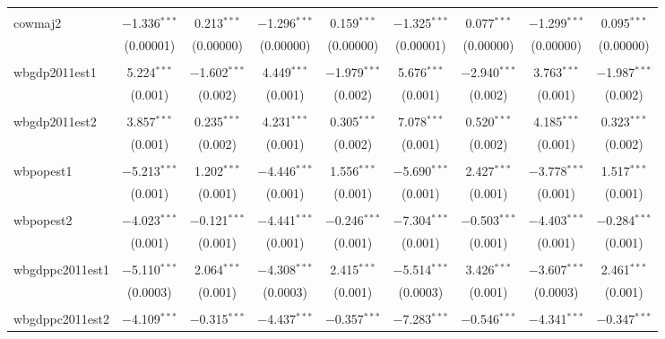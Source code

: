 \begin{table}[!htbp]
\begin{tabular}{@{\extracolsep{5pt}}lcccccccc}
  & & & & & & & & \\ 
 cowmaj2 & $-$1.336$^{***}$ & 0.213$^{***}$ & $-$1.296$^{***}$ & 0.159$^{***}$ & $-$1.325$^{***}$ & 0.077$^{***}$ & $-$1.299$^{***}$ & 0.095$^{***}$ \\ 
  & (0.00001) & (0.00000) & (0.00000) & (0.00000) & (0.00001) & (0.00000) & (0.00000) & (0.00000) \\ 
  & & & & & & & & \\ 
 wbgdp2011est1 & 5.224$^{***}$ & $-$1.602$^{***}$ & 4.449$^{***}$ & $-$1.979$^{***}$ & 5.676$^{***}$ & $-$2.940$^{***}$ & 3.763$^{***}$ & $-$1.987$^{***}$ \\ 
  & (0.001) & (0.002) & (0.001) & (0.002) & (0.001) & (0.002) & (0.001) & (0.002) \\ 
  & & & & & & & & \\ 
 wbgdp2011est2 & 3.857$^{***}$ & 0.235$^{***}$ & 4.231$^{***}$ & 0.305$^{***}$ & 7.078$^{***}$ & 0.520$^{***}$ & 4.185$^{***}$ & 0.323$^{***}$ \\ 
  & (0.001) & (0.002) & (0.001) & (0.002) & (0.001) & (0.002) & (0.001) & (0.002) \\ 
  & & & & & & & & \\ 
 wbpopest1 & $-$5.213$^{***}$ & 1.202$^{***}$ & $-$4.446$^{***}$ & 1.556$^{***}$ & $-$5.690$^{***}$ & 2.427$^{***}$ & $-$3.778$^{***}$ & 1.517$^{***}$ \\ 
  & (0.001) & (0.001) & (0.001) & (0.001) & (0.001) & (0.001) & (0.001) & (0.001) \\ 
  & & & & & & & & \\ 
 wbpopest2 & $-$4.023$^{***}$ & $-$0.121$^{***}$ & $-$4.441$^{***}$ & $-$0.246$^{***}$ & $-$7.304$^{***}$ & $-$0.503$^{***}$ & $-$4.403$^{***}$ & $-$0.284$^{***}$ \\ 
  & (0.001) & (0.001) & (0.001) & (0.001) & (0.001) & (0.001) & (0.001) & (0.001) \\ 
  & & & & & & & & \\ 
 wbgdppc2011est1 & $-$5.110$^{***}$ & 2.064$^{***}$ & $-$4.308$^{***}$ & 2.415$^{***}$ & $-$5.514$^{***}$ & 3.426$^{***}$ & $-$3.607$^{***}$ & 2.461$^{***}$ \\ 
  & (0.0003) & (0.001) & (0.0003) & (0.001) & (0.0003) & (0.001) & (0.0003) & (0.001) \\ 
  & & & & & & & & \\ 
 wbgdppc2011est2 & $-$4.109$^{***}$ & $-$0.315$^{***}$ & $-$4.437$^{***}$ & $-$0.357$^{***}$ & $-$7.283$^{***}$ & $-$0.546$^{***}$ & $-$4.341$^{***}$ & $-$0.347$^{***}$ \\ 

\end{tabular}
\end{table}
